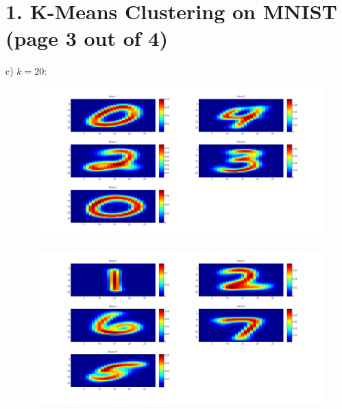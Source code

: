 \documentclass[11pt]{article}
\begin{document}
\section*{1. K-Means Clustering on MNIST (page 3 out of 4)}
c) $k=20$:
\begin{figure}[ht!]
\centering
\includegraphics[width=180mm]{images/mean20-1.png}
\label{overflow}
\end{figure}
\begin{figure}[ht!]
\centering
\includegraphics[width=180mm]{images/mean20-2.png}
\label{overflow}
\end{figure}
\newpage
\end{document}
